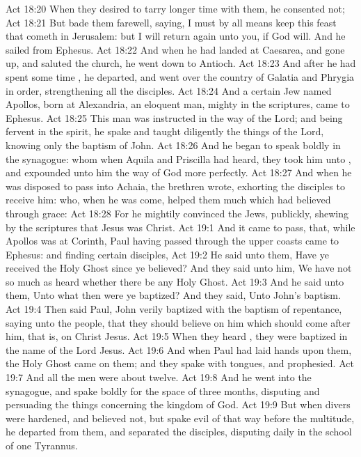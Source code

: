 \vs Act 18:20 When they desired  to tarry longer time with them, he consented not;
\vs Act 18:21 But bade them farewell, saying, I must by all means keep this feast that cometh in Jerusalem: but I will return again unto you, if God will. And he sailed from Ephesus.
\vs Act 18:22 And when he had landed at Caesarea, and gone up, and saluted the church, he went down to Antioch.
\vs Act 18:23 And after he had spent some time , he departed, and went over  the country of Galatia and Phrygia in order, strengthening all the disciples.
\vs Act 18:24 And a certain Jew named Apollos, born at Alexandria, an eloquent man,  mighty in the scriptures, came to Ephesus.
\vs Act 18:25 This man was instructed in the way of the Lord; and being fervent in the spirit, he spake and taught diligently the things of the Lord, knowing only the baptism of John.
\vs Act 18:26 And he began to speak boldly in the synagogue: whom when Aquila and Priscilla had heard, they took him unto , and expounded unto him the way of God more perfectly.
\vs Act 18:27 And when he was disposed to pass into Achaia, the brethren wrote, exhorting the disciples to receive him: who, when he was come, helped them much which had believed through grace:
\vs Act 18:28 For he mightily convinced the Jews,  publickly, shewing by the scriptures that Jesus was Christ.
\vs Act 19:1 And it came to pass, that, while Apollos was at Corinth, Paul having passed through the upper coasts came to Ephesus: and finding certain disciples,
\vs Act 19:2 He said unto them, Have ye received the Holy Ghost since ye believed? And they said unto him, We have not so much as heard whether there be any Holy Ghost.
\vs Act 19:3 And he said unto them, Unto what then were ye baptized? And they said, Unto John's baptism.
\vs Act 19:4 Then said Paul, John verily baptized with the baptism of repentance, saying unto the people, that they should believe on him which should come after him, that is, on Christ Jesus.
\vs Act 19:5 When they heard , they were baptized in the name of the Lord Jesus.
\vs Act 19:6 And when Paul had laid  hands upon them, the Holy Ghost came on them; and they spake with tongues, and prophesied.
\vs Act 19:7 And all the men were about twelve.
\vs Act 19:8 And he went into the synagogue, and spake boldly for the space of three months, disputing and persuading the things concerning the kingdom of God.
\vs Act 19:9 But when divers were hardened, and believed not, but spake evil of that way before the multitude, he departed from them, and separated the disciples, disputing daily in the school of one Tyrannus.

